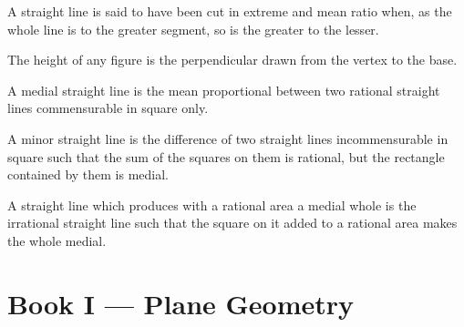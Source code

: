 \documentclass{rrxiv}
\begin{document}

\begin{scope}
\label{def:XIII.1}
A straight line is said to have been cut in extreme and mean ratio
when, as the whole line is to the greater segment, so is the greater
to the lesser.
\end{scope}

\begin{scope}
\label{def:XIII.2}
The height of any figure is the perpendicular drawn from the vertex
to the base.
\end{scope}

\begin{scope}
\label{def:XIII.3}
A medial straight line is the mean proportional between two rational
straight lines commensurable in square only.
\end{scope}

\begin{scope}
\label{def:XIII.4}
A minor straight line is the difference of two straight lines
incommensurable in square such that the sum of the squares on them
is rational, but the rectangle contained by them is medial.
\end{scope}

\begin{scope}
\label{def:XIII.5}
A straight line which produces with a rational area a medial whole
is the irrational straight line such that the square on it added to
a rational area makes the whole medial.
\end{scope}

%
%

\section{Book I --- Plane Geometry}
\label{sec:book-I}
\end{document}
